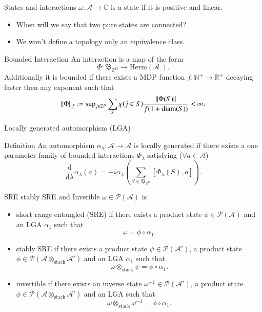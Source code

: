 \documentclass{beamer}
\newcommand{\CC}{\mathbb{C}}
\newcommand{\dd}{\mathrm{d}}
\newcommand{\ZZ}{\mathbb{Z}}
\renewcommand{\AA}{\mathcal{A}}
\begin{document}
\begin{frame}{States and interactions}
$\omega:\AA\rightarrow \CC$ is a state if it is positive and linear.\\
\pause
\begin{itemize}
\item When will we say that two pure states are connected?
\pause
\item We won't define a topology only an equivalence class.
\end{itemize}
\pause
\begin{block}{Bounded Interaction}
An interaction is a map of the form
\[\Phi:\mathfrak{B}_{\ZZ^D}\rightarrow\textrm{Herm}(\AA_{\cdot}).\]
\pause
Additionally it is bounded if there exists a MDP function $f:\mathbb{N}^+\rightarrow \mathbb{R}^+$ decaying faster then any exponent such that
\[\norm{\Phi}_f:=\textrm{sup}_{j\in\ZZ^D}\sum_{S}\chi(j\in S)\frac{\norm{\Phi(S)}}{f(1+\textrm{diam}(S))}<\infty.\]
\end{block}
\end{frame}

\begin{frame}{Locally generated automorphism (LGA)}
\begin{block}{Definition}
An automorphism $\alpha_\lambda:\AA\rightarrow \AA$ is locally generated if there exists a one parameter family of bounded interactions $\Phi_\lambda$ satisfying ($\forall a\in\AA$)
\[\frac{\dd}{\dd \lambda}\alpha_\lambda(a)=-i\alpha_\lambda\left(\sum_{S\in\mathfrak{B}_{\ZZ^D}}[\Phi_\lambda(S),a]\right).\]
\end{block}
\end{frame}

\begin{frame}{SRE stably SRE and Inverible}
$\omega\in\mathcal{P}(\AA)$ is
\pause
\begin{itemize}
\item short range entangled (SRE) if there exists a product state $\phi\in\mathcal{P}(\AA)$ and an LGA $\alpha_1$ such that
\[\omega=\phi\circ\alpha_1.\]
\pause
\item stably SRE if there exists a product state $\psi\in\mathcal{P}(\AA')$, a product state $\phi\in\mathcal{P}(\AA\otimes_{\text{stack}} \AA')$ and an LGA $\alpha_1$ such that
\[\omega\otimes_{\text{stack}}\psi =\phi\circ\alpha_1.\]
\pause
\item invertible if there exists an inverse state $\omega^{-1}\in\mathcal{P}(\AA')$, a product state $\phi\in\mathcal{P}(\AA\otimes_{\text{stack}}\AA')$ and an LGA such that
\[\omega\otimes_{\text{stack}}\omega^{-1}=\phi\circ\alpha_1.\]
\end{itemize}
\end{frame}
\end{document}

